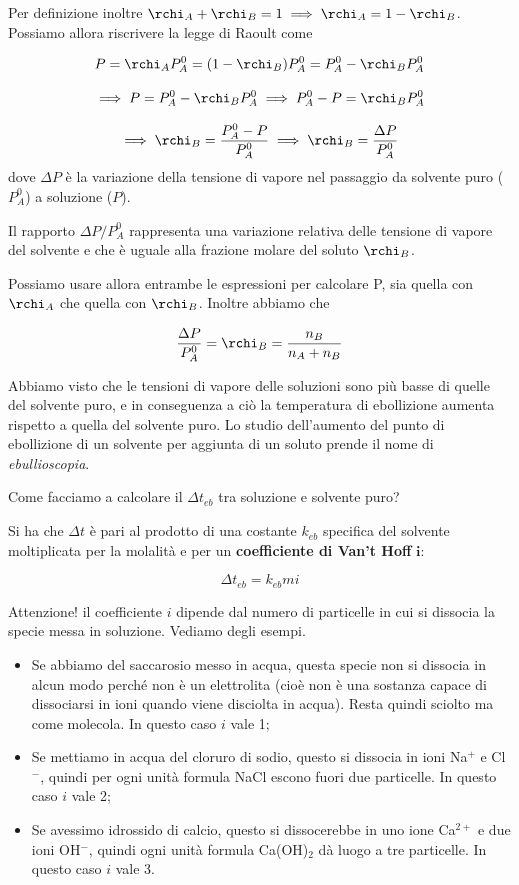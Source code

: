 Per definizione inoltre $\rchi_A + \rchi_B = 1 \implies \rchi_A = 1 - \rchi_B$. Possiamo allora riscrivere la legge di Raoult come 

$$P=\rchi_AP^0_A=(1- \rchi_B)P^0_A=P^0_A - \rchi_BP^0_A$$

$$\implies P=P^0_A - \rchi_BP^0_A \implies P^0_A - P = \rchi_BP^0_A$$

$$\implies \rchi_B=\frac{P^0_A - P}{P^0_A} \implies \rchi_B=\frac{\Delta P}{P^0_A}$$
dove $\Delta P$ è la variazione della tensione di vapore nel passaggio da solvente puro ($P_A^0$) a soluzione ($P$).

Il rapporto $\Delta P/P_A^0$ rappresenta una variazione relativa delle tensione di vapore del solvente e che è uguale alla frazione molare del soluto $\rchi_B$.

Possiamo usare allora entrambe le espressioni per calcolare P, sia quella con $\rchi_A$ che quella con $\rchi_B$. Inoltre abbiamo che

$$\frac{\Delta P}{P_A^0}= \rchi_B = \frac{n_B}{n_A + n_B}$$

Abbiamo visto che le tensioni di vapore delle soluzioni sono più basse di quelle del solvente puro, e in conseguenza a ciò la temperatura di ebollizione aumenta rispetto a quella del solvente puro. Lo studio dell'aumento del punto di ebollizione di un solvente per aggiunta di un soluto prende il nome di \textit{ebullioscopia}.

Come facciamo a calcolare il $\Delta t_{eb}$ tra soluzione e solvente puro?

Si ha che $\Delta t$ è pari al prodotto di una costante $k_{eb}$ specifica del solvente moltiplicata per la molalità e per un \textbf{coefficiente di Van't Hoff} $\boldsymbol{i}$:

$$\Delta t_{eb} = k_{eb} m i$$

Attenzione! il coefficiente $i$ dipende dal numero di particelle in cui si dissocia la specie messa in soluzione. Vediamo degli esempi.

\begin{itemize}
    \item Se abbiamo del saccarosio messo in acqua, questa specie non si dissocia in alcun modo perché non è un elettrolita (cioè non è una sostanza capace di dissociarsi in ioni quando viene disciolta in acqua). Resta quindi sciolto ma come molecola. In questo caso $i$ vale 1;
    \item Se mettiamo in acqua del cloruro di sodio, questo si dissocia in ioni Na$^+$ e Cl$^-$, quindi per ogni unità formula NaCl escono fuori due particelle. In questo caso $i$ vale 2;
    \item Se avessimo idrossido di calcio, questo si dissocerebbe in uno ione Ca$^{2+}$ e due ioni OH$^-$, quindi ogni unità formula Ca(OH)$_2$ dà luogo a tre particelle. In questo caso $i$ vale 3.
\end{itemize}

